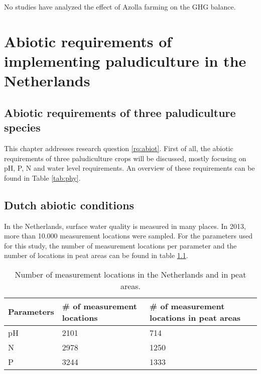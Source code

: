 {No studies have analyzed the effect of Azolla farming on the GHG balance. 

\chapter{Abiotic requirements of implementing paludiculture in the Netherlands} \label{ch:abiot}

\section{Abiotic requirements of three paludiculture species}

This chapter addresses research question \ref{rq:abiot}. First of all, the abiotic requirements of three paludiculture crops will be discussed, mostly focusing on pH, \ac{P}, \ac{N} and water level requirements. An overview of these requirements can be found in Table \ref{tab:phy}.





\section{Dutch abiotic conditions}

In the Netherlands, surface water quality is measured in many places. In 2013, more than 10.000 measurement locations were sampled. For the parameters used for this study, the number of measurement locations per parameter and the number of locations in peat areas can be found in table \ref{tab:abioticmeasurements}.

\begin{table}[htbp]
\caption{Number of measurement locations in the Netherlands and in peat areas.}
\begin{center}
\begin{tabular}{|p{5cm}|p{5cm}|p{5cm}|}
\hline
Parameters & \multicolumn{1}{l|}{\# of measurement locations} & \multicolumn{1}{l|}{ \# of measurement locations in peat areas} \\ \hline
pH & 2101 & 714 \\ \hline
N & 2978 & 1250 \\ \hline
P & 3244 & 1333 \\ \hline
\end{tabular}
\end{center}
\label{tab:abioticmeasurements}
\end{table}


}

